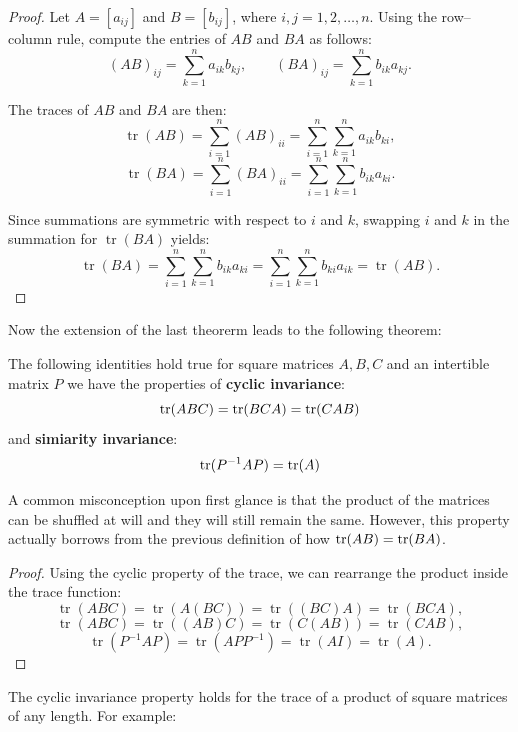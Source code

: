 \documentclass[12pt]{article}
\begin{document}
\begin{proof}
    Let $A = [a_{ij}]$ and $B = [b_{ij}]$, where $i,j = 1,2,\ldots,n$. Using the row–column rule, compute the entries of $AB$ and $BA$ as follows:
    \[
        (AB)_{ij} = \sum_{k=1}^{n} a_{ik} b_{kj}, \qquad
        (BA)_{ij} = \sum_{k=1}^{n} b_{ik} a_{kj}.
    \]

    The traces of $AB$ and $BA$ are then:
    \[
        \operatorname{tr}(AB)
        = \sum_{i=1}^{n} (AB)_{ii}
        = \sum_{i=1}^{n} \sum_{k=1}^{n} a_{ik} b_{ki},
    \]
    \[
        \operatorname{tr}(BA)
        = \sum_{i=1}^{n} (BA)_{ii}
        = \sum_{i=1}^{n} \sum_{k=1}^{n} b_{ik} a_{ki}.
    \]

    Since summations are symmetric with respect to $i$ and $k$, swapping $i$ and $k$ in the summation for $\operatorname{tr}(BA)$ yields:
    \[
        \operatorname{tr}(BA)
        = \sum_{i=1}^{n} \sum_{k=1}^{n} b_{ik} a_{ki}
        = \sum_{i=1}^{n} \sum_{k=1}^{n} b_{ki} a_{ik}
        = \operatorname{tr}(AB).
    \]
\end{proof}

Now the extension of the last theorerm leads to the following theorem:

\begin{theorem}
    The following identities hold true for square matrices $A, B, C$ and an intertible matrix $P$ we have the properties of \textbf{cyclic invariance}:
    $$\operatorname{tr}(ABC) = \operatorname{tr}(BCA) = \operatorname{tr}(CAB)$$
    and \textbf{simiarity invariance}:
    $$\operatorname{tr}({P}^{-1} A P) = \operatorname{tr}(A)$$
\end{theorem}

A common misconception upon first glance is that the product of the matrices can be shuffled at will and they will still remain the same. However, this property actually borrows from the previous definition of how $\operatorname{tr}(AB) = \operatorname{tr}(BA)$.

\begin{proof}
    Using the cyclic property of the trace, we can rearrange the product inside the trace function:
    \[
    \operatorname{tr}(ABC) = \operatorname{tr}(A(BC)) = \operatorname{tr}((BC)A) = \operatorname{tr}(BCA),
    \]
    \[
    \operatorname{tr}(ABC) = \operatorname{tr}((AB)C) = \operatorname{tr}(C(AB)) = \operatorname{tr}(CAB),
    \]
    \[
    \operatorname{tr}(P^{-1} A P) = \operatorname{tr}(A P P^{-1}) = \operatorname{tr}(A I) = \operatorname{tr}(A).
    \]
\end{proof}

The cyclic invariance property holds for the trace of a product of square matrices of any length. For example:
\end{document}
